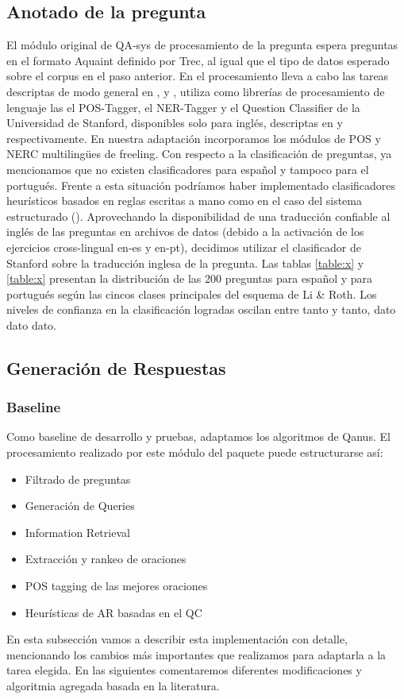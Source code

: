 \subsection{Anotado de la pregunta}
El módulo original de QA-sys de procesamiento de la pregunta espera preguntas en el formato Aquaint definido por Trec, al igual que el tipo de datos esperado sobre el corpus en el paso anterior. En el procesamiento lleva a cabo las tareas descriptas de modo general en ,  y ,  utiliza como librerías de procesamiento de lenguaje las el POS-Tagger, el NER-Tagger y el Question Classifier de la Universidad de Stanford, disponibles solo para inglés, descriptas en  y  respectivamente.
En nuestra adaptación incorporamos los módulos de POS y NERC multilingües de freeling. Con respecto a la clasificación de preguntas, ya mencionamos que no existen clasificadores para español {\color{red} y tampoco para el portugués}. Frente a esta situación podríamos haber implementado clasificadores heurísticos basados en reglas escritas a mano como en el caso del sistema estructurado (). Aprovechando la disponibilidad de una traducción confiable al inglés de las preguntas en archivos de datos (debido a la activación de los ejercicios cross-lingual en-es y en-pt), decidimos utilizar el clasificador de Stanford sobre la traducción inglesa de la pregunta.
Las tablas \ref{table:x} y \ref{table:x} presentan la distribución de las 200 preguntas para español y para portugués según las cincos clases principales del esquema de Li \& Roth. Los niveles de confianza en la clasificación logradas oscilan entre tanto y tanto, dato dato dato.


\subsection{Generación de Respuestas}
\subsubsection{Baseline}
\falta
Como baseline de desarrollo y pruebas, adaptamos los algoritmos de Qanus. 
El procesamiento realizado por este módulo del paquete puede estructurarse así:
\begin{itemize}
  \item Filtrado de preguntas
  \item Generación de Queries
  \item Information Retrieval
  \item Extracción y rankeo de oraciones
  \item POS tagging de las mejores oraciones
  \item Heurísticas de AR basadas en el QC
\end{itemize}
En esta subsección vamos a describir esta implementación con detalle, mencionando los cambios más importantes que realizamos para adaptarla a la tarea elegida. En las siguientes comentaremos diferentes modificaciones y algoritmia agregada basada en la literatura. 

